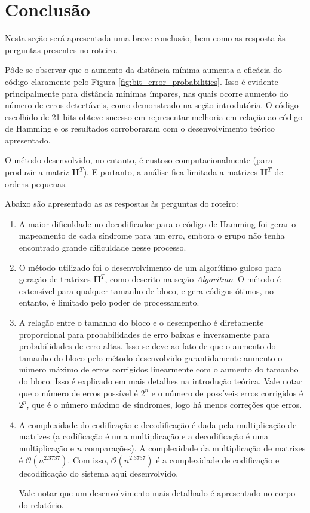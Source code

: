\section{Conclusão}
Nesta seção será apresentada uma breve conclusão, bem como as resposta às perguntas presentes no roteiro.

Pôde-se observar que o aumento da distância mínima aumenta a eficácia do código claramente pelo Figura \ref{fig:bit_error_probabilities}. Isso é evidente principalmente para distância mínimas ímpares, nas quais ocorre aumento do número de erros detectáveis, como demonstrado na seção introdutória. O código escolhido de 21 bits obteve sucesso em representar melhoria em relação ao código de Hamming e os resultados corroboraram com o desenvolvimento teórico apresentado.

O método desenvolvido, no entanto, é custoso computacionalmente (para produzir a matriz $\textbf{H}^T$). E portanto, a análise fica limitada a matrizes $\textbf{H}^T$ de ordens pequenas.

Abaixo são apresentado as as respostas às perguntas do roteiro:

\begin{enumerate}
	\item A maior dificuldade no decodificador para o código de Hamming foi gerar o mapeamento de cada síndrome para um erro, embora o grupo não tenha encontrado grande dificuldade nesse processo.
	\item O método utilizado foi o desenvolvimento de um algorítimo guloso para geração de tratrizes $\textbf{H}^T$, como descrito na seção \textit{Algoritmo}. O método é extensível para qualquer tamanho de bloco, e gera códigos ótimos, no entanto, é limitado pelo poder de processamento.
	\item A relação entre o tamanho do bloco e o desempenho é diretamente proporcional para probabilidades de erro baixas e inversamente para probabilidades de erro altas. Isso se deve ao fato de que o aumento do tamanho do bloco pelo método desenvolvido garantidamente aumento o número máximo de erros corrigidos linearmente com o aumento do tamanho do bloco. Isso é explicado em mais detalhes na introdução teórica. Vale notar que o número de erros possível é $2^n$ e o número de possíveis erros corrigidos é $2^p$, que é o número máximo de síndromes, logo há menos correções que erros. 
	\item A complexidade do codificação e decodificação é dada pela multiplicação de matrizes (a codificação é uma multiplicação e a decodificação é uma multiplicação e $n$ comparações). A complexidade da multiplicação de matrizes é $\mathcal{O}(n^{2.3737})$. Com isso, $\mathcal{O}(n^{2.3737})$ é a complexidade de codificação e decodificação do sistema aqui desenvolvido.
	
	Vale notar que um desenvolvimento mais detalhado é apresentado no corpo do relatório.
\end{enumerate}






